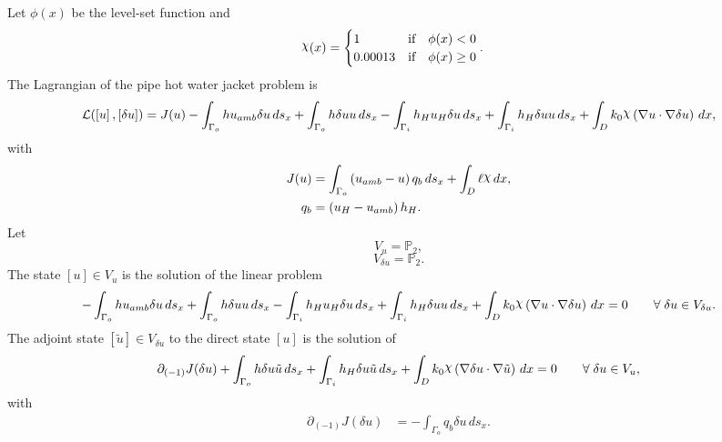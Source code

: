 \documentclass[preview]{standalone}
\let\oldcdot\cdot
\let\cdot\oldcdot
\begin{document}
Let $\phi(x)$ be the level-set function and
 \begin{align*}\raisebox{\depth}{$\chi$}(x) &= \begin{cases} 1 & \mbox{if}\quad \phi(x) < 0 \\ 0.00013 & \mbox{if}\quad \phi(x)  \ge 0 \end{cases}.\end{align*}
The Lagrangian of the pipe hot water jacket problem is
\begin{dmath*}
\mathcal L(\left[ u\right],\left[ \delta u\right]) = J(u) -  \int_{\Gamma_o} h u_{amb} \delta u \,ds_x +  \int_{\Gamma_o} h \delta u u \,ds_x -  \int_{\Gamma_i} h_{H} u_{H} \delta u \,ds_x +  \int_{\Gamma_i} h_{H} \delta u u \,ds_x +  \int_{D} k_{0} \raisebox{\depth}{$\chi$} \left(  \nabla u  \cdot  \nabla \delta u  \right) \,dx , 
\end{dmath*}
with 
\begin{align*}
J(u) &=  \int_{\Gamma_o} \left(u_{amb} - u\right) q_{b} \,ds_x +  \int_{D} \ell \raisebox{\depth}{$\chi$} \,dx,\\
q_{b} &= \left(u_{H} - u_{amb}\right) h_{H}.
 \end{align*}
Let
\begin{equation*}
V_{u} = \mathbb P_{2},\end{equation*}
\begin{equation*}
V_{\delta u} = \mathbb P_{2}.\end{equation*}
The state $\left[ u\right] \in  V_{u}$ is the solution of the linear problem
\begin{dmath*}
-  \int_{\Gamma_o} h u_{amb} \delta u \,ds_x +  \int_{\Gamma_o} h \delta u u \,ds_x -  \int_{\Gamma_i} h_{H} u_{H} \delta u \,ds_x +  \int_{\Gamma_i} h_{H} \delta u u \,ds_x +  \int_{D} k_{0} \raisebox{\depth}{$\chi$} \left(  \nabla u  \cdot  \nabla \delta u  \right) \,dx = 0\qquad \forall\; {\delta u\in V_{\delta u}} . 
\end{dmath*}
The adjoint state $\left[ \tilde u\right] \in  V_{\delta u}$ to the direct state $\left[ u\right]$ is the solution of
\begin{dmath*}
\partial_{(-1)} J(\delta u) +  \int_{\Gamma_o} h \delta u \tilde u \,ds_x +  \int_{\Gamma_i} h_{H} \delta u \tilde u \,ds_x +  \int_{D} k_{0} \raisebox{\depth}{$\chi$} \left(  \nabla \delta u  \cdot  \nabla \tilde u  \right) \,dx = 0\qquad \forall\; {\delta u\in V_{u}} , 
\end{dmath*}
with 
\begin{align*}
\partial_{(-1)} J(\delta u) &= -  \int_{\Gamma_o} q_{b} \delta u \,ds_x.
 \end{align*}
\end{document}
